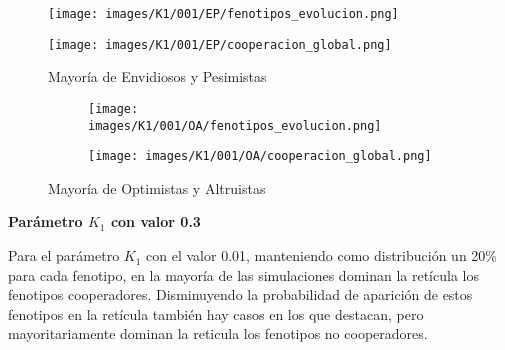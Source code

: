 \documentclass[a4paper,12pt]{report}
\begin{document}
\begin{figure}[h]
    \centering
    \begin{minipage}{0.49\textwidth}
    \centering
    \texttt{[image: images/K1/001/EP/fenotipos\_evolucion.png]}
    \label{fig:enter-label}
    \end{minipage}
    \hfill
    \begin{minipage}{0.49\textwidth}
    \centering
    \texttt{[image: images/K1/001/EP/cooperacion\_global.png]}
    \label{fig:enter-label}
    \end{minipage}
    \caption{Mayoría de Envidiosos y Pesimistas}
\end{figure}
\begin{figure}[h]
    \centering
    \begin{subfigure}[t]{0.49\textwidth}
        \centering
        \texttt{[image: images/K1/001/OA/fenotipos\_evolucion.png]}
        \label{fig:enter-label}
    \end{subfigure}
    \hfill
    \begin{subfigure}[t]{0.49\textwidth}
        \centering
        \texttt{[image: images/K1/001/OA/cooperacion\_global.png]}
        \label{fig:enter-label}
    \end{subfigure}
    \caption{Mayoría de Optimistas y Altruistas}
\end{figure}

\newpage

\vspace{1.5em}
\noindent\textbf{Parámetro \( K_1 \) con valor 0.3}
\vspace{0.5em}


Para el parámetro \( K_1 \) con el valor 0.01, manteniendo como distribución un 20\% para cada fenotipo, en la mayoría de las simulaciones dominan la retícula los fenotipos cooperadores.
Disminuyendo la probabilidad de aparición de estos fenotipos en la retícula también hay casos en los que destacan, pero mayoritariamente dominan la reticula los fenotipos no cooperadores.
\end{document}
